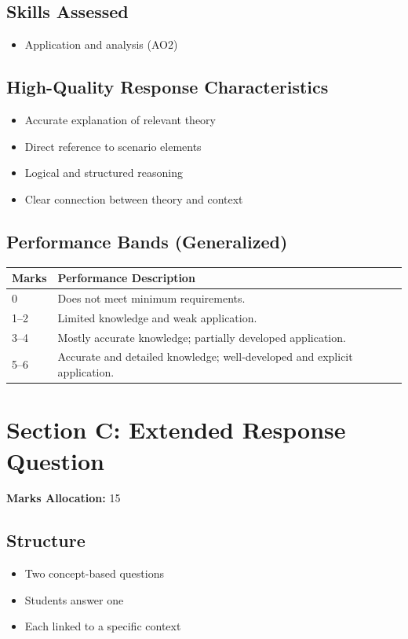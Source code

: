 \documentclass[12pt,a4paper]{article}
\begin{document}
\subsection*{Skills Assessed}
\begin{itemize}
    \item Application and analysis (AO2)
\end{itemize}

\subsection*{High-Quality Response Characteristics}
\begin{itemize}
    \item Accurate explanation of relevant theory
    \item Direct reference to scenario elements
    \item Logical and structured reasoning
    \item Clear connection between theory and context
\end{itemize}

\subsection*{Performance Bands (Generalized)}

\begin{longtable}{p{1.5cm} p{12cm}}
\toprule
\textbf{Marks} & \textbf{Performance Description} \\
\midrule
0 & Does not meet minimum requirements. \\
1--2 & Limited knowledge and weak application. \\
3--4 & Mostly accurate knowledge; partially developed application. \\
5--6 & Accurate and detailed knowledge; well-developed and explicit application. \\
\bottomrule
\end{longtable}

\newpage

\section{Section C: Extended Response Question}

\textbf{Marks Allocation:} 15

\subsection*{Structure}
\begin{itemize}
    \item Two concept-based questions
    \item Students answer one
    \item Each linked to a specific context
\end{itemize}
\end{document}
